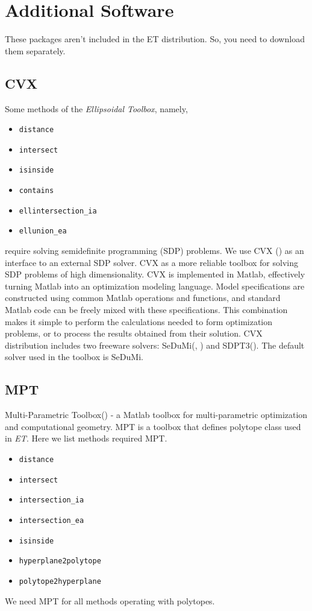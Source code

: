 \section{Additional Software}
These packages aren't included in the ET distribution.
So, you need to download them separately.
\subsection{CVX}
Some methods of the {\it Ellipsoidal Toolbox}, namely,
\begin{itemize}
\item {\tt distance}
\item {\tt intersect}
\item {\tt isinside}
\item {\tt contains}
\item {\tt ellintersection\_ia}
\item {\tt ellunion\_ea}
\end{itemize}
require solving semidefinite programming (SDP) problems.
We use CVX (\cite{cvxhp}) as an
interface to an external SDP solver. CVX as a more reliable toolbox
for solving SDP problems of high dimensionality.
CVX is implemented in Matlab, effectively turning Matlab into an
optimization modeling language. Model specifications are constructed
using common Matlab operations and functions, and standard
Matlab code can be freely mixed with these specifications.
This combination makes it simple to perform the calculations needed
to form optimization problems, or to process the results
obtained from their solution. CVX distribution includes two freeware
solvers: SeDuMi(\cite{sedumi}, \cite{sedumihp})
and SDPT3(\cite{sdpt}). The default solver used in the toolbox is SeDuMi.

\subsection{MPT}
Multi-Parametric Toolbox(\cite{mpt}) - a Matlab toolbox for multi-parametric
optimization and computational geometry. MPT is a toolbox
that defines polytope class
used in {\it ET}.
Here we list methods required MPT.
\begin{itemize}
\item {\tt distance}
\item {\tt intersect}
\item {\tt intersection\_ia}
\item {\tt intersection\_ea}
\item {\tt isinside}
\item {\tt hyperplane2polytope}
\item {\tt polytope2hyperplane}
\end{itemize}
We need MPT for all methods operating with polytopes.


